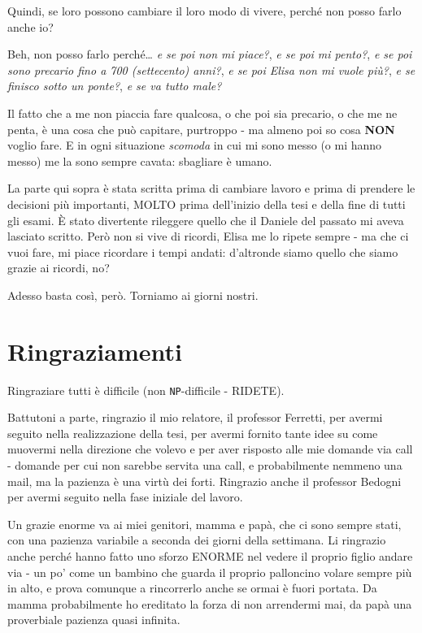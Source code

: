 Quindi, se loro possono cambiare il loro modo di vivere, perché non posso farlo anche io?

Beh, non posso farlo perché\ldots
\textit{e se poi non mi piace?},
\textit{e se poi mi pento?},
\textit{e se poi sono precario fino a 700 (settecento) anni?},
\textit{e se poi Elisa non mi vuole più?},
\textit{e se finisco sotto un ponte?},
\textit{e se va tutto male?}

Il fatto che a me non piaccia fare qualcosa, o che poi sia precario, o che me ne penta, è una cosa che può capitare, purtroppo - ma almeno poi so cosa \textbf{NON} voglio fare.
E in ogni situazione \textit{scomoda} in cui mi sono messo (o mi hanno messo) me la sono sempre cavata: sbagliare è umano.

La parte qui sopra è stata scritta prima di cambiare lavoro e prima di prendere le decisioni più importanti, MOLTO prima dell'inizio della tesi e della fine di tutti gli esami.
È stato divertente rileggere quello che il Daniele del passato mi aveva lasciato scritto.
Però non si vive di ricordi, Elisa me lo ripete sempre - ma che ci vuoi fare, mi piace ricordare i tempi andati: d'altronde siamo quello che siamo grazie ai ricordi, no?

Adesso basta così, però.
Torniamo ai giorni nostri.

\section*{Ringraziamenti}

Ringraziare tutti è difficile (non \texttt{NP}-difficile - RIDETE).

Battutoni a parte, ringrazio il mio relatore, il professor Ferretti, per avermi seguito nella realizzazione della tesi, per avermi fornito tante idee su come muovermi nella direzione che volevo e per aver risposto alle mie domande via call - domande per cui non sarebbe servita una call, e probabilmente nemmeno una mail, ma la pazienza è una virtù dei forti.
Ringrazio anche il professor Bedogni per avermi seguito nella fase iniziale del lavoro.

Un grazie enorme va ai miei genitori, mamma e papà, che ci sono sempre stati, con una pazienza variabile a seconda dei giorni della settimana.
Li ringrazio anche perché hanno fatto uno sforzo ENORME nel vedere il proprio figlio andare via - un po' come un bambino che guarda il proprio palloncino volare sempre più in alto, e prova comunque a rincorrerlo anche se ormai è fuori portata.
Da mamma probabilmente ho ereditato la forza di non arrendermi mai, da papà una proverbiale pazienza quasi infinita.


